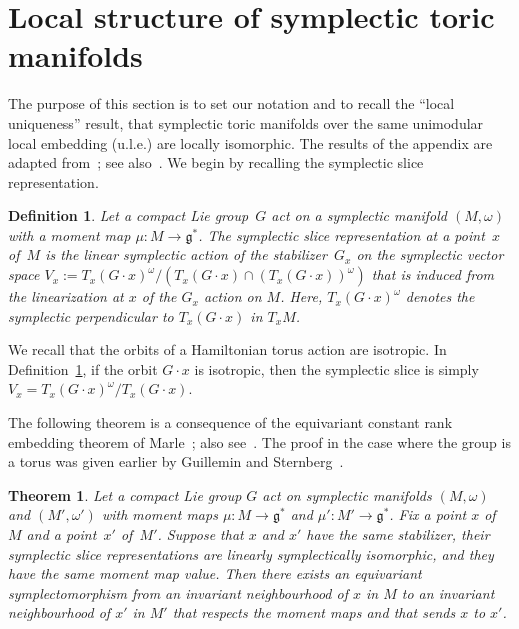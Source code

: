 \documentclass[10pt,a4paper]{amsart}
\numberwithin{equation}{section}
\newtheorem{Theorem}[Lemma]{Theorem}
\newtheorem{Definition}[Lemma]{Definition}
\begin{document}
\section{Local structure of symplectic toric manifolds}
\label{sec:background}

The purpose of this section is to set our notation
and to recall the ``local uniqueness'' result,
that symplectic toric manifolds
over the same unimodular local embedding (u.l.e.)
are locally isomorphic.  The results of the appendix
are adapted from~\cite{De}; see also~\cite{LT}.
We begin by recalling the symplectic slice representation.

\begin{Definition} \label{def:s.slice}
Let a compact Lie group~$G$ act on a symplectic manifold $(M,\omega)$
with a moment map $\mu \colon M \to {\mathfrak g}^*$.
The \emph{symplectic slice representation} at a point~$x$ of~$M$
is the linear symplectic action of the stabilizer~$G_x$
on the symplectic vector space
$V_x := T_x  (G\cdot x)^\omega /
 (T_x (G\cdot x) \cap  (T_x (G \cdot x))^\omega )$
that is induced from the linearization at $x$ of the $G_x$ action on $M$.
Here, $T_x (G\cdot x)^\omega$ denotes the symplectic perpendicular
to $T_x (G\cdot x)$ in $T_xM$.
\end{Definition}

We recall that the orbits of a Hamiltonian torus action are isotropic.
In Def\/inition~\ref{def:s.slice}, if the orbit $G \cdot x$
is isotropic, then the symplectic slice is simply
$V_x = T_x  (G\cdot x)^\omega / T_x (G\cdot x) $.

The following theorem is a consequence of the equivariant constant
rank embedding theorem of Marle~\cite{marle}; also see~\cite[Section 2]{LS}.
The proof in the case where the
group is a torus was given earlier by Guillemin and
Sternberg~\cite{GS:normal}.

\begin{Theorem}\label{thm:equiv-isotro-emb}
Let a compact Lie group $G$ act on symplectic manifolds
$(M,\omega)$ and $(M',\omega')$ with moment maps
$\mu \colon M \to {\mathfrak g}^*$ and $\mu' \colon M' \to {\mathfrak g}^*$.
Fix a point $x$ of $M$ and a point~$x'$ of~$M'$.
Suppose that $x$ and $x'$ have the same stabilizer,
their symplectic slice representations are linearly symplectically isomorphic,
and they have the same moment map value.
Then there exists an equivariant symplectomorphism
from an invariant neighbourhood of $x$ in $M$
to an invariant neighbourhood of $x'$ in $M'$
that respects the moment maps and that sends $x$ to $x'$.
\end{Theorem}
\end{document}
